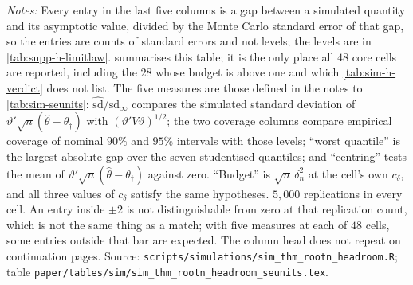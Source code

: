 \documentclass[
  12pt]{article}
\newcommand{\1}[1]{\mathds{1}\left[#1\right]}
\theoremstyle{plain}
\theoremstyle{definition}
\theoremstyle{definition}
\theoremstyle{remark}
\begin{document}
\begingroup
\footnotesize
{}
\label{tab:supp-h-seunits}
\let\tabular\longtable
\let\endtabular\endlongtable

\addtocounter{table}{-1}
\endgroup
\begingroup\footnotesize
\textit{Notes:} Every entry in the last five columns is a gap between a simulated
quantity and its asymptotic value, divided by the Monte Carlo standard error of
that gap, so the entries are counts of standard errors and not levels; the levels
are in \cref{tab:supp-h-limitlaw}.  summarises this
table; it is the only place all $48$ core cells are reported, including the $28$
whose budget is above one and which \cref{tab:sim-h-verdict} does not list. The five
measures are those defined in the notes to \cref{tab:sim-seunits}:
$\hat{\mathrm{sd}}/\mathrm{sd}_\infty$ compares the simulated standard deviation
of $\vartheta'\sqrt n(\hat\theta-\theta_\dagger)$ with $(\vartheta'V\vartheta)^{1/2}$;
the two coverage columns compare empirical coverage of nominal $90\%$ and $95\%$
intervals with those levels; ``worst quantile'' is the largest absolute gap over
the seven studentised quantiles; and ``centring'' tests the mean of
$\vartheta'\sqrt n(\hat\theta-\theta_\dagger)$ against zero. ``Budget'' is
$\sqrt n\,\delta_n^{2}$ at the cell's own $c_\delta$, and all three values of
$c_\delta$ satisfy the same hypotheses. $5{,}000$ replications in every cell. An
entry inside $\pm2$ is not distinguishable from zero at that replication count,
which is not the same thing as a match; with five measures at each of $48$ cells,
some entries outside that bar are expected. The column head does not repeat on
continuation pages. Source:
\texttt{scripts/simulations/sim\_thm\_rootn\_headroom.R}; table
\texttt{paper/tables/sim/sim\_thm\_rootn\_headroom\_seunits.tex}.
\par\endgroup
\clearpage
\end{document}
